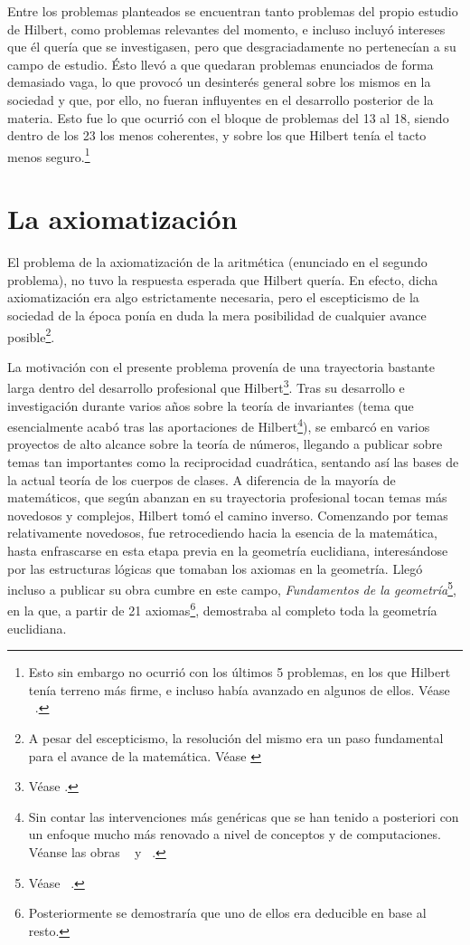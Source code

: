 Entre los problemas planteados se encuentran tanto problemas del propio estudio de Hilbert, como problemas relevantes del momento, e incluso incluyó intereses que él quería que se
investigasen, pero que desgraciadamente no pertenecían a su campo de estudio. Ésto llevó a que quedaran problemas enunciados de forma demasiado vaga, lo que provocó un desinterés 
general sobre los mismos en la sociedad y que, por ello, no fueran influyentes en el desarrollo posterior de la materia. Esto fue lo que ocurrió con el bloque de problemas del 13 al 18, siendo dentro
de los 23 los menos coherentes, y sobre los que Hilbert tenía el tacto menos seguro.\footnote{Esto sin embargo no ocurrió con los últimos 5 problemas, en los que Hilbert tenía terreno
más firme, e incluso había avanzado en algunos de ellos. Véase ~\cite[Pág. 85]{BREZIS199876}.}  


\section{La axiomatización}

El problema de la axiomatización de la aritmética (enunciado en el segundo problema), no tuvo la respuesta esperada que Hilbert quería. En efecto, dicha axiomatización
era algo estrictamente necesaria, pero el escepticismo de la sociedad de la época ponía en duda la mera posibilidad de cualquier avance posible\footnote{A pesar del escepticismo, la resolución del mismo era un paso 
fundamental para el avance de la matemática. Véase \cite{paradis1979crisis}}.

La motivación con el presente problema provenía de una trayectoria bastante larga dentro del desarrollo profesional que Hilbert\footnote{Véase \cite{orellana2019enfoque}.}. Tras su desarrollo e investigación durante varios años sobre 
la teoría de invariantes (tema que esencialmente acabó tras las aportaciones de Hilbert\footnote{Sin contar las intervenciones más genéricas que se han tenido a posteriori con un enfoque
mucho más renovado a nivel de conceptos y de computaciones. Véanse las obras ~\cite{reid1986hilbert} y ~\cite{dyson1970life}.}), se embarcó en varios proyectos de alto alcance sobre la teoría de números, 
llegando a publicar sobre temas tan importantes como la reciprocidad cuadrática, sentando así las bases de la actual teoría de los cuerpos de clases. A diferencia de la mayoría de matemáticos, que según abanzan en 
su trayectoria profesional tocan temas más novedosos y complejos, Hilbert tomó el camino inverso. Comenzando por temas relativamente novedosos, fue retrocediendo hacia la esencia de la matemática, hasta enfrascarse
en esta etapa previa en la geometría euclidiana, interesándose por las estructuras lógicas que tomaban los axiomas en la geometría. Llegó incluso a publicar su obra cumbre en este campo, 
\textit{Fundamentos de la geometría}\footnote{Véase ~\cite{hilbert1991fundamentos}.}, en la que, a partir de 21 axiomas\footnote{Posteriormente se demostraría que uno de ellos era deducible en base al resto.},
demostraba al completo toda la geometría euclidiana. 

